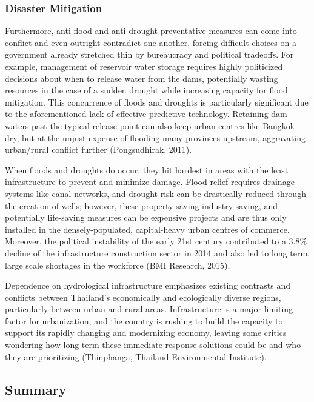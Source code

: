 \subsubsection{Disaster Mitigation}

Furthermore, anti-flood and anti-drought preventative measures can come into conflict and even outright contradict one another, forcing difficult choices on a government already stretched thin by bureaucracy and political tradeoffs. For example, management of reservoir water storage requires highly politicized decisions about when to release water from the dams, potentially wasting resources in the case of a sudden drought while increasing capacity for flood mitigation. This concurrence of floods and droughts is particularly significant due to the aforementioned lack of effective predictive technology. Retaining dam waters past the typical release point can also keep urban centres like Bangkok dry, but at the unjust expense of flooding many provinces upstream, aggravating urban/rural conflict further (Pongsudhirak, 2011). 

When floods and droughts do occur, they hit hardest in areas with the least infrastructure to prevent and minimize damage. Flood relief requires drainage systems like canal networks, and drought risk can be drastically reduced through the creation of wells; however, these property-saving industry-saving, and potentially life-saving measures can be expensive projects and are thus only installed in the densely-populated, capital-heavy urban centres of commerce. Moreover, the political instability of the early 21st century contributed to a 3.8\% decline of the infrastructure construction sector in 2014 and also led to long term, large scale shortages in the workforce (BMI Research, 2015).

Dependence on hydrological infrastructure emphasizes existing contrasts and conflicts between Thailand's economically and ecologically diverse regions, particularly between urban and rural areas. Infrastructure is a major limiting factor for urbanization, and the country is rushing to build the capacity to support its rapidly changing and modernizing economy, leaving some critics wondering how long-term these immediate response solutions could be and who they are prioritizing (Thinphanga, Thailand Environmental Institute). 

\subsection{Summary}

